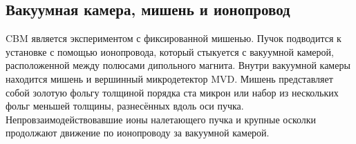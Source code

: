 
\subsection{Вакуумная камера, мишень и ионопровод}\label{sec:secVacChamberPipe}

CBM является экспериментом с фиксированной мишенью. Пучок подводится к установке с помощью ионопровода, который стыкуется с вакуумной камерой, расположенной между полюсами дипольного магнита. Внутри вакуумной камеры находится мишень и вершинный микродетектор MVD. Мишень представляет собой золотую фольгу толщиной порядка ста микрон или набор из нескольких фольг меньшей толщины, разнесённых вдоль оси пучка. Непровзаимодействовавшие ионы налетающего пучка и крупные осколки продолжают движение по ионопроводу за вакуумной камерой.

